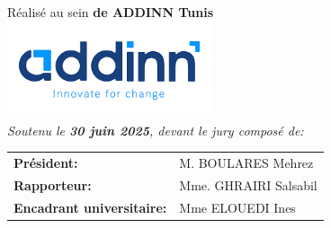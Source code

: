 \begin{titlepage}
\begin{adjustwidth}{1.6cm}{0cm}
\begin{center}
\begin{adjustwidth}{-1cm}{0cm}
\begin{center}
{\begin{minipage}{\textwidth}
                    \end{minipage}
                }\\
            \end{center}
        \end{adjustwidth}
         \Large \fontsize{12}{12}\selectfont Réalisé au sein \textbf{de ADDINN Tunis} \\
         \includegraphics[width=6cm]{pages/page-de-garde/img/logo.png}\\
         \textit{\Large \fontsize{12}{12}\selectfont  Soutenu le \textbf{30 juin 2025}, devant le jury composé de:} \\
        \vspace{-0.5cm}
        \begin{center}
            \renewcommand{\arraystretch}{1.5} 
            \begin{tabular}{p{}p{}}
                    \textbf{Président:} & M. BOULARES Mehrez\\
                    
                    \textbf{Rapporteur:} & Mme. GHRAIRI Salsabil\\
                    
                    \textbf{Encadrant universitaire:} & Mme ELOUEDI Ines\\
                    

\end{tabular}
\end{center}
\end{center}
\end{adjustwidth}
\end{titlepage}
